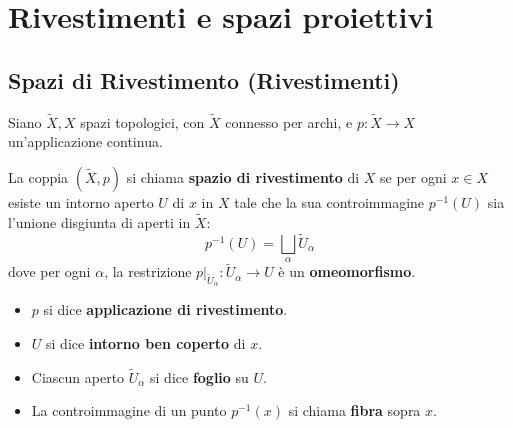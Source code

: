 \chapter{Rivestimenti e spazi proiettivi}

\section{Spazi di Rivestimento (Rivestimenti)}

\begin{definicion}
Siano $\widetilde{X}, X$ spazi topologici, con $\widetilde{X}$ connesso per archi, e $p: \widetilde{X} \to X$ un'applicazione continua.

La coppia $(\widetilde{X}, p)$ si chiama \textbf{spazio di rivestimento} di $X$ se per ogni $x \in X$ esiste un intorno aperto $U$ di $x$ in $X$ tale che la sua controimmagine $p^{-1}(U)$ sia l'unione disgiunta di aperti in $\widetilde{X}$:
\[
p^{-1}(U) = \bigsqcup_{\alpha} \widetilde{U}_\alpha
\]
dove per ogni $\alpha$, la restrizione $p|_{\widetilde{U}_\alpha}: \widetilde{U}_\alpha \to U$ è un \textbf{omeomorfismo}.
\end{definicion}

\begin{notacion}
\begin{itemize}
    \item $p$ si dice \textbf{applicazione di rivestimento}.
    \item $U$ si dice \textbf{intorno ben coperto} di $x$.
    \item Ciascun aperto $\widetilde{U}_\alpha$ si dice \textbf{foglio} su $U$.
    \item La controimmagine di un punto $p^{-1}(x)$ si chiama \textbf{fibra} sopra $x$.
\end{itemize}
\end{notacion}

